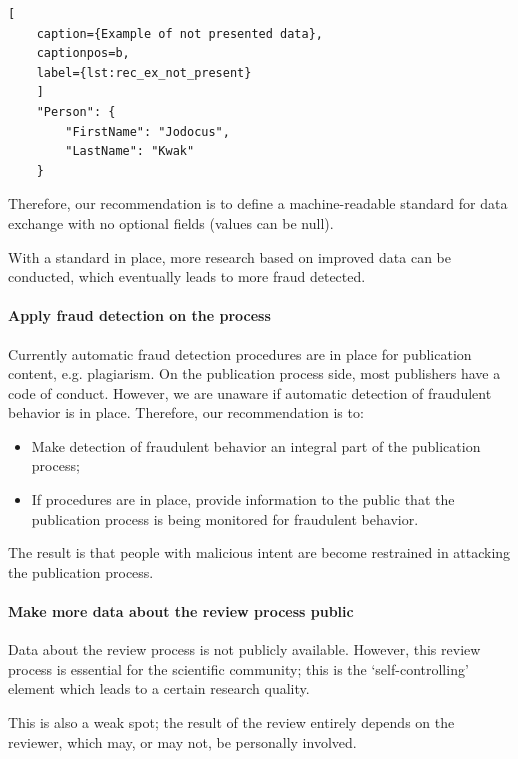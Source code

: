 \documentclass{ou-report}
\begin{document}
\begin{lstlisting}[
    caption={Example of not presented data},
    captionpos=b,
    label={lst:rec_ex_not_present}
    ]
    "Person": {
        "FirstName": "Jodocus",
        "LastName": "Kwak"
    }
\end{lstlisting}

Therefore, our recommendation is to define a machine-readable standard for data 
exchange with no optional fields (values can be null).

With a standard in place, more research based on improved data can be conducted, 
which eventually leads to more fraud detected.

\paragraph{Apply fraud detection on the process}
Currently automatic fraud detection procedures are in place for publication 
content, e.g. plagiarism. On the publication process side, most publishers have 
a code of conduct. However, we are unaware if automatic detection of fraudulent 
behavior is in place.
Therefore, our recommendation is to:
\begin{itemize}
    \item Make detection of fraudulent behavior an integral part of the 
        publication process;
    \item If procedures are in place, provide information to the public that the 
        publication process is being monitored for fraudulent behavior.
\end{itemize}

The result is that people with malicious intent are become restrained in 
attacking the publication process.

\paragraph{Make more data about the review process public}
Data about the review process is not publicly available. However, this review 
process is essential for the scientific community; this is the 
`self-controlling’ element which leads to a certain research quality.

This is also a weak spot; the result of the review entirely depends on the 
reviewer, which may, or may not, be personally involved.
\end{document}
